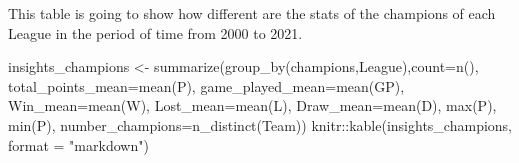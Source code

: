 \documentclass[
]{article}
\newenvironment{Shaded}{\begin{snugshade}}{\end{snugshade}}
\newcommand{\AttributeTok}[1]{\textcolor[rgb]{0.77,0.63,0.00}{#1}}
\newcommand{\FunctionTok}[1]{\textcolor[rgb]{0.00,0.00,0.00}{#1}}
\newcommand{\NormalTok}[1]{#1}
\newcommand{\OtherTok}[1]{\textcolor[rgb]{0.56,0.35,0.01}{#1}}
\newcommand{\SpecialCharTok}[1]{\textcolor[rgb]{0.00,0.00,0.00}{#1}}
\newcommand{\StringTok}[1]{\textcolor[rgb]{0.31,0.60,0.02}{#1}}
\begin{document}
This table is going to show how different are the stats of the champions
of each League in the period of time from 2000 to 2021.

\begin{Shaded}
\begin{Highlighting}[]
\NormalTok{insights\_champions }\OtherTok{\textless{}{-}} \FunctionTok{summarize}\NormalTok{(}\FunctionTok{group\_by}\NormalTok{(champions,League),}\AttributeTok{count=}\FunctionTok{n}\NormalTok{(), }\AttributeTok{total\_points\_mean=}\FunctionTok{mean}\NormalTok{(P), }\AttributeTok{game\_played\_mean=}\FunctionTok{mean}\NormalTok{(GP), }
                                \AttributeTok{Win\_mean=}\FunctionTok{mean}\NormalTok{(W), }\AttributeTok{Lost\_mean=}\FunctionTok{mean}\NormalTok{(L), }\AttributeTok{Draw\_mean=}\FunctionTok{mean}\NormalTok{(D), }\FunctionTok{max}\NormalTok{(P), }\FunctionTok{min}\NormalTok{(P), }\AttributeTok{number\_champions=}\FunctionTok{n\_distinct}\NormalTok{(Team))}
\NormalTok{knitr}\SpecialCharTok{::}\FunctionTok{kable}\NormalTok{(insights\_champions, }\AttributeTok{format =} \StringTok{"markdown"}\NormalTok{)}
\end{Highlighting}
\end{Shaded}
\end{document}
